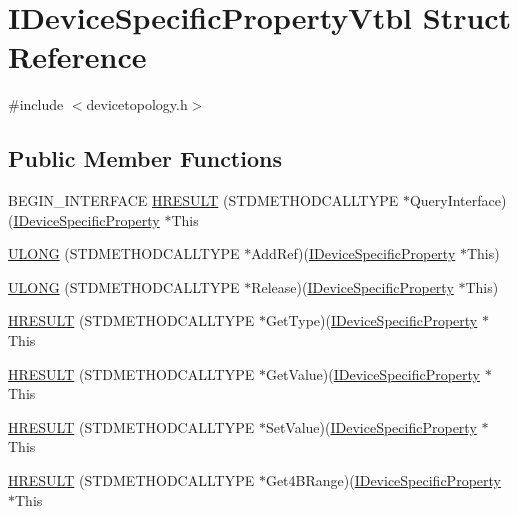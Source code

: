 \hypertarget{struct_i_device_specific_property_vtbl}{}\section{I\+Device\+Specific\+Property\+Vtbl Struct Reference}
\label{struct_i_device_specific_property_vtbl}


{\ttfamily \#include $<$devicetopology.\+h$>$}

\subsection*{Public Member Functions}
\begin{DoxyCompactItemize}
\item 
B\+E\+G\+I\+N\+\_\+\+I\+N\+T\+E\+R\+F\+A\+CE \hyperlink{struct_i_device_specific_property_vtbl_a94da97a60405e9b01641945acc452802}{H\+R\+E\+S\+U\+LT} (S\+T\+D\+M\+E\+T\+H\+O\+D\+C\+A\+L\+L\+T\+Y\+PE $\ast$Query\+Interface)(\hyperlink{devicetopology_8h_aa8942016eefe4a31f160d79b3256cb7f}{I\+Device\+Specific\+Property} $\ast$This
\item 
\hyperlink{struct_i_device_specific_property_vtbl_a35072a7a6ef750d6b0e1b20219f0153e}{U\+L\+O\+NG} (S\+T\+D\+M\+E\+T\+H\+O\+D\+C\+A\+L\+L\+T\+Y\+PE $\ast$Add\+Ref)(\hyperlink{devicetopology_8h_aa8942016eefe4a31f160d79b3256cb7f}{I\+Device\+Specific\+Property} $\ast$This)
\item 
\hyperlink{struct_i_device_specific_property_vtbl_af9b606cf04207323f0cb2084135ad270}{U\+L\+O\+NG} (S\+T\+D\+M\+E\+T\+H\+O\+D\+C\+A\+L\+L\+T\+Y\+PE $\ast$Release)(\hyperlink{devicetopology_8h_aa8942016eefe4a31f160d79b3256cb7f}{I\+Device\+Specific\+Property} $\ast$This)
\item 
\hyperlink{struct_i_device_specific_property_vtbl_a9b73e79417168ceef0ca86d6b3340c87}{H\+R\+E\+S\+U\+LT} (S\+T\+D\+M\+E\+T\+H\+O\+D\+C\+A\+L\+L\+T\+Y\+PE $\ast$Get\+Type)(\hyperlink{devicetopology_8h_aa8942016eefe4a31f160d79b3256cb7f}{I\+Device\+Specific\+Property} $\ast$This
\item 
\hyperlink{struct_i_device_specific_property_vtbl_a1f026e5f7519994db90a74d3a1b854cf}{H\+R\+E\+S\+U\+LT} (S\+T\+D\+M\+E\+T\+H\+O\+D\+C\+A\+L\+L\+T\+Y\+PE $\ast$Get\+Value)(\hyperlink{devicetopology_8h_aa8942016eefe4a31f160d79b3256cb7f}{I\+Device\+Specific\+Property} $\ast$This
\item 
\hyperlink{struct_i_device_specific_property_vtbl_a74ad9077f8f1e715429bfa805d254375}{H\+R\+E\+S\+U\+LT} (S\+T\+D\+M\+E\+T\+H\+O\+D\+C\+A\+L\+L\+T\+Y\+PE $\ast$Set\+Value)(\hyperlink{devicetopology_8h_aa8942016eefe4a31f160d79b3256cb7f}{I\+Device\+Specific\+Property} $\ast$This
\item 
\hyperlink{struct_i_device_specific_property_vtbl_a9978f454bdf9b12d09c8f12e760283d2}{H\+R\+E\+S\+U\+LT} (S\+T\+D\+M\+E\+T\+H\+O\+D\+C\+A\+L\+L\+T\+Y\+PE $\ast$Get4\+B\+Range)(\hyperlink{devicetopology_8h_aa8942016eefe4a31f160d79b3256cb7f}{I\+Device\+Specific\+Property} $\ast$This
\end{DoxyCompactItemize}
